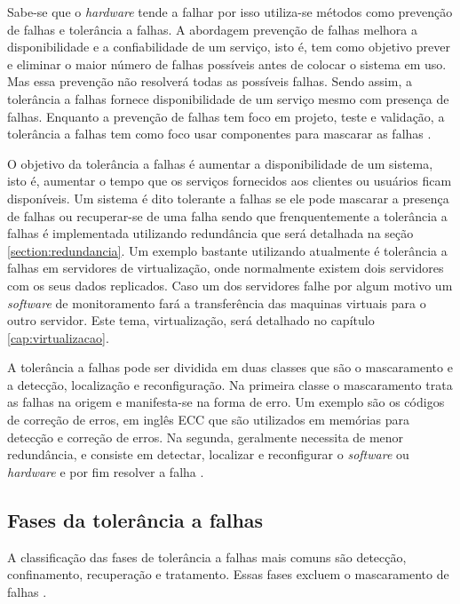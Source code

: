 Sabe-se que o \textit{hardware} tende a falhar por isso utiliza-se métodos como prevenção de falhas e tolerância a falhas. A abordagem 
prevenção de falhas melhora a disponibilidade e a confiabilidade de um serviço, isto é, tem como objetivo prever e eliminar 
o maior número de falhas possíveis antes de colocar o sistema em uso. Mas essa prevenção não resolverá todas as possíveis falhas. 
Sendo assim, a tolerância a falhas fornece disponibilidade de um serviço mesmo com presença de falhas. Enquanto a prevenção de falhas 
tem foco em projeto, teste e validação, a tolerância a falhas tem como foco usar componentes para mascarar as falhas \cite{pankaj1994}.

O objetivo da tolerância a falhas é aumentar a disponibilidade de um sistema, isto é, aumentar o tempo que os serviços fornecidos aos 
clientes ou usuários ficam disponíveis. Um sistema é dito tolerante a falhas se ele pode mascarar a presença de falhas ou recuperar-se 
de uma falha sendo que frenquentemente a tolerância a falhas é implementada utilizando redundância que será detalhada na seção 
\ref{section:redundancia}. Um exemplo bastante utilizando atualmente é tolerância a falhas em servidores de virtualização, onde normalmente
existem dois servidores com os seus dados replicados. Caso um dos servidores falhe por algum motivo um \textit{software} de monitoramento
fará a transferência das maquinas virtuais para o outro servidor. Este tema, virtualização, será detalhado no capítulo \ref{cap:virtualizacao}.

A tolerância a falhas pode ser dividida em duas classes que são o mascaramento e a detecção, localização e reconfiguração.
Na primeira classe o mascaramento trata as falhas na origem e manifesta-se na forma de erro. Um exemplo são os códigos de correção de 
erros, em inglês \ac{ECC} que são utilizados em memórias para detecção e correção de erros.
Na segunda, geralmente necessita de menor redundância, e consiste em detectar, localizar e reconfigurar o \textit{software} ou
\textit{hardware} e por fim resolver a falha \cite{weber2002}.

\subsection{Fases da tolerância a falhas}

A classificação das fases de tolerância a falhas mais comuns são detecção, confinamento, recuperação e tratamento. Essas fases excluem
o mascaramento de falhas \cite{weber2002}.

